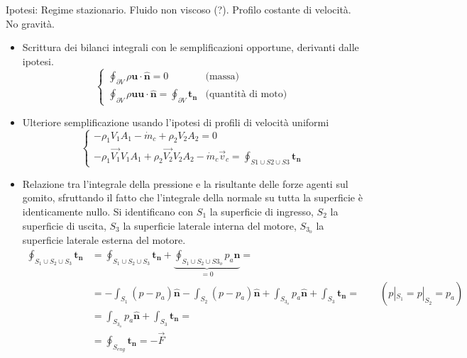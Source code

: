 \parttwo
Ipotesi: Regime stazionario. Fluido non viscoso (?). Profilo costante di velocità. No gravità.

\begin{itemize}
  \item Scrittura dei bilanci integrali con le semplificazioni opportune, derivanti dalle ipotesi.
    \begin{equation}
     \begin{cases}
      \oint_{\partial V} \rho \bm{u} \cdot \hat{\bm{n}} = 0  & \text{(massa)} \\
      \oint_{\partial V} \rho \bm{u} \bm{u} \cdot \hat{\bm{n}} = \oint_{\partial V} \bm{t_n} & \text{(quantità di moto)}
     \end{cases}
    \end{equation}
  \item Ulteriore semplificazione usando l'ipotesi di profili di velocità uniformi
    \begin{equation}
     \begin{cases}
      - \rho_1 V_1 A_1 -\dot{m}_c + \rho_2 V_2 A_2 = 0  \\
      - \rho_1 \vec{V_1} V_1 A_1 + \rho_2 \vec{V_2} V_2 A_2 - \dot{m}_c \vec{v}_c = \oint_{S1\cup S2\cup S3} \bm{t_n}
     \end{cases}
    \end{equation}
  \item Relazione tra l'integrale della pressione e la risultante delle forze agenti sul gomito, sfruttando il fatto che l'integrale della normale su tutta la superficie è identicamente nullo. Si identificano con $S_1$ la superficie di ingresso, $S_2$ la superficie di uscita, $S_3$ la superficie laterale interna del motore, $S_{3_o}$ la superficie laterale esterna del motore.
    \begin{equation}
     \begin{aligned}
      \displaystyle\oint_{S_1\cup S_2\cup S_3} \bm{t_n} & = \displaystyle\oint_{S_1\cup S_2\cup S_3} \bm{t_n} + \underbrace{\displaystyle\oint_{S_1\cup S_2\cup S{3_o}} p_a \hat{\bm{n}}}_{=0} = \\
      & = -\int_{S_1} (p-p_a) \hat{\bm{n}} - \int_{S_2} (p-p_a) \hat{\bm{n}} + \int_{S_{3_o}} p_a \hat{\bm{n}} + \int_{S_3} \bm{t_n}  = \qquad(p|_{S_1} = p|_{S_2} = p_a) \\
      & = \int_{S_{3_o}} p_a \hat{\bm{n}} + \int_{S_3} \bm{t_n} = \\
      & = \oint_{S_{eng}} \bm{t_n} = - \vec{F}
     \end{aligned}
    \end{equation}

\end{itemize}

